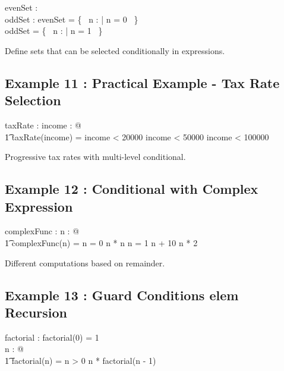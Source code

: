\documentclass[a4paper,10pt,fleqn]{article}
\begin{document}
\begin{axdef}
evenSet : \power \nat \\
oddSet : \power \nat
\where
evenSet = \{~ n : \nat | n  = 0 ~\} \\
oddSet = \{~ n : \nat | n  = 1 ~\}
\end{axdef}

\noindent Define sets that can be selected conditionally in expressions.

\bigskip

\subsection*{Example 11 : Practical Example - Tax Rate Selection}

\begin{axdef}
taxRate : \nat \fun \nat
\where
\forall income : \nat @ \\
\t1 taxRate(income) = \IF income < 20000  \ELSE \IF income < 50000  \ELSE \IF income < 100000  
\end{axdef}

\noindent Progressive tax rates with multi-level conditional.

\bigskip

\subsection*{Example 12 : Conditional with Complex Expression}

\begin{axdef}
complexFunc : \nat \fun \nat
\where
\forall n : \nat @ \\
\t1 complexFunc(n) = \IF n  = 0 \THEN n * n \ELSE \IF n  = 1 \THEN n + 10 \ELSE n * 2
\end{axdef}

\noindent Different computations based on remainder.

\bigskip

\subsection*{Example 13 : Guard Conditions elem Recursion}

\begin{axdef}
factorial : \nat \fun \nat
\where
factorial(0) = 1 \\
\forall n : \nat @ \\
\t1 factorial(n) = \IF n > 0 \THEN n * factorial(n - 1) 
\end{axdef}
\end{document}
